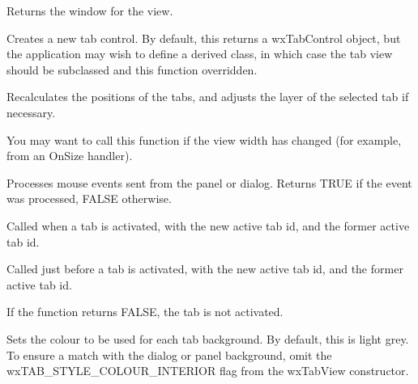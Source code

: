 
Returns the window for the view.



Creates a new tab control. By default, this returns a wxTabControl object, but the application may wish
to define a derived class, in which case the tab view should be subclassed and this function overridden.



Recalculates the positions of the tabs, and adjusts the layer of the selected tab if necessary.

You may want to call this function if the view width has changed (for example, from an OnSize handler).



Processes mouse events sent from the panel or dialog. Returns TRUE if the event was processed,
FALSE otherwise.



Called when a tab is activated, with the new active tab id, and the former active tab id.



Called just before a tab is activated, with the new active tab id, and the former active tab id.

If the function returns FALSE, the tab is not activated.



Sets the colour to be used for each tab background. By default, this is
light grey. To ensure a match with the dialog or panel background, omit
the wxTAB\_STYLE\_COLOUR\_INTERIOR flag from the wxTabView constructor. 


